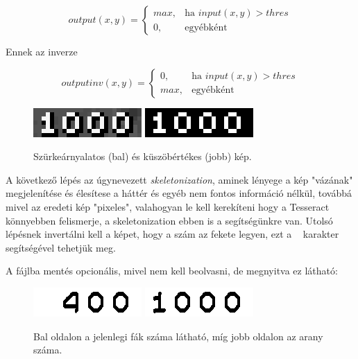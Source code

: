 
\begin{equation*}
    output(x,y) = \left\{ 
    \begin{matrix}
        max, & \text{ha } input(x,y) > thres \\
        0, & \text{egyébként}
    \end{matrix} \right.
\end{equation*}

Ennek az inverze

\begin{equation*}
    outputinv(x,y) = \left\{ 
    \begin{matrix}
        0, & \text{ha } input(x,y) > thres \\
        max, & \text{egyébként}
    \end{matrix} \right.
\end{equation*}

\begin{figure}[h]
    \centering
    \includegraphics[scale=1]{images/grey.png}
    \includegraphics[scale=1]{images/thres.png}
    \caption{Szürkeárnyalatos (bal) és küszöbértékes (jobb) kép.}
    \label{fig:numbers}
\end{figure}

A következő lépés az úgynevezett \textit{skeletonization}{\cite{skeletonization}}, aminek lényege a kép "vázának" megjelenítése és élesítese a háttér és egyéb nem fontos információ nélkül, továbbá mivel az eredeti kép "pixeles", valahogyan le kell kerekíteni hogy a Tesseract könnyebben felismerje, a skeletonization ebben is a segítségünkre van. Utolsó lépésnek invertálni kell a képet, hogy a szám az fekete legyen, ezt a \textit{~} karakter segítségével tehetjük meg.

A fájlba mentés opcionális, mivel nem kell beolvasni, de megnyitva ez látható: 

\begin{figure}[h]
    \centering
    \includegraphics[scale=1]{images/Lumber.png}
    \includegraphics[scale=1]{images/Gold.png}
    \caption{Bal oldalon a jelenlegi fák száma látható, míg jobb oldalon az arany száma. }
    \label{fig:numbers}
\end{figure}

